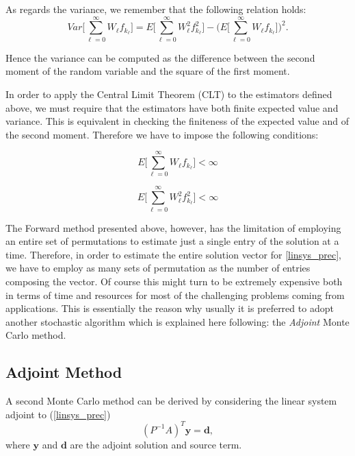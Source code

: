 \documentclass[a4paper,10pt]{article}
\begin{document}
As regards the variance, we remember that the following relation holds:
\begin{equation}
Var\bigg [\sum_{\ell=0}^\infty W_{\ell} 
f_{k_{\ell}}\bigg]=E\bigg[\sum_{\ell=0}^\infty W_{\ell}^2 
f_{k_{\ell}}^2\bigg] - \bigg (E\bigg[\sum_{\ell=0}^\infty W_{\ell} 
f_{k_{\ell}}\bigg]\bigg )^2.
\label{dir_var}
\end{equation}

Hence the variance can be computed as the difference between the second 
moment of the random variable and the square of the first moment.\newline

In order to apply the Central Limit Theorem (CLT) to the estimators defined 
above, we must require that 
the estimators have both finite expected value and variance. This is 
equivalent in 
checking the finiteness of the expected value and of the second moment.
Therefore we have to impose the following conditions:

\begin{equation}
 E\bigg[\sum_{\ell=0}^\infty W_{\ell} f_{k_{\ell}}\bigg]<\infty
\end{equation}

\begin{equation}
 E\bigg[\sum_{\ell=0}^\infty W_{\ell}^2 
f_{k_{\ell}}^2\bigg]<\infty
\end{equation}

The Forward method presented above, however, has the limitation of employing an 
entire set of permutations to estimate just a single entry of 
the solution at a time. Therefore, in order to estimate the entire solution 
vector for \ref{linsys_prec}, we have to employ as many sets of permutation as 
the number of entries composing the vector. Of course this might turn to be 
extremely expensive both in terms of time and resources for most of the 
challenging problems coming from applications. This is essentially the reason 
why usually it is preferred to adopt another stochastic algorithm which is 
explained here following: the \textit{Adjoint} Monte Carlo method.

\subsection{Adjoint Method}
A second Monte Carlo method can be derived by considering the linear system 
adjoint to (\ref{linsys_prec})
\begin{equation}
(P^{-1}A)^T\mathbf{y}=\mathbf{d},
\label{adj}
\end{equation}
where $\mathbf{y}$ and $\mathbf{d}$ are the adjoint solution and source term. 
\end{document}
